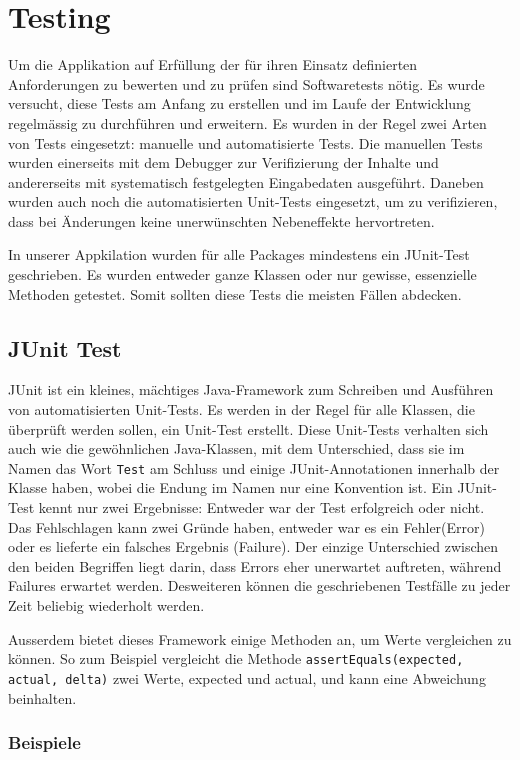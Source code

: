 \section{Testing}
Um die Applikation auf Erfüllung der für ihren Einsatz definierten
Anforderungen zu bewerten und zu prüfen sind Softwaretests nötig. Es wurde
versucht, diese Tests am Anfang zu erstellen und im Laufe der Entwicklung
regelmässig zu durchführen und erweitern. Es wurden in der Regel zwei Arten
von Tests eingesetzt: manuelle und automatisierte Tests. Die manuellen Tests
wurden einerseits mit dem Debugger zur Verifizierung der Inhalte und
andererseits mit systematisch festgelegten Eingabedaten ausgeführt. Daneben
wurden auch noch die automatisierten Unit-Tests eingesetzt, um zu
verifizieren, dass bei Änderungen keine unerwünschten Nebeneffekte
hervortreten. 

In unserer Appkilation wurden für alle Packages mindestens ein JUnit-Test
geschrieben. Es wurden entweder ganze Klassen oder nur gewisse, essenzielle
Methoden getestet. Somit sollten diese Tests die meisten Fällen abdecken. 

\subsection{JUnit Test}
JUnit ist ein kleines, mächtiges Java-Framework zum Schreiben und Ausführen
von automatisierten Unit-Tests. Es werden in der Regel für alle Klassen, die
überprüft werden sollen, ein Unit-Test erstellt. Diese Unit-Tests verhalten
sich auch wie die gewöhnlichen Java-Klassen, mit dem Unterschied, dass sie im
Namen das Wort \texttt{Test} am Schluss und einige JUnit-Annotationen innerhalb der
Klasse haben, wobei die Endung im Namen nur eine Konvention ist. Ein
JUnit-Test kennt nur zwei Ergebnisse: Entweder war der Test erfolgreich oder
nicht. Das Fehlschlagen kann zwei Gründe haben, entweder war es ein
Fehler(Error) oder es lieferte ein falsches Ergebnis (Failure). Der einzige
Unterschied zwischen den beiden Begriffen liegt darin, dass Errors eher
unerwartet auftreten, während Failures erwartet werden. Desweiteren können die
geschriebenen Testfälle zu jeder Zeit beliebig wiederholt werden. 

Ausserdem bietet dieses Framework einige Methoden an, um Werte vergleichen zu
können. So zum Beispiel vergleicht die Methode \texttt{assertEquals(expected, actual,
delta)} zwei Werte, expected und actual, und kann eine Abweichung beinhalten. 

\subsubsection{Beispiele}

